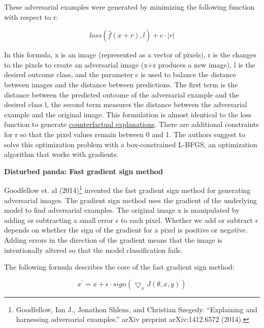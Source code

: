 \documentclass[12pt,]{krantz}
\begin{document}
These adversarial examples were generated by minimizing the following
function with respect to r:

\[loss(\hat{f}(x+r),l)+c\cdot|r|\]

In this formula, x is an image (represented as a vector of pixels), r is
the changes to the pixels to create an adversarial image (x+r produces a
new image), l is the desired outcome class, and the parameter c is used
to balance the distance between images and the distance between
predictions. The first term is the distance between the predicted
outcome of the adversarial example and the desired class l, the second
term measures the distance between the adversarial example and the
original image. This formulation is almost identical to the loss
function to generate \protect\hyperlink{counterfactual}{counterfactual
explanations}. There are additional constraints for r so that the pixel
values remain between 0 and 1. The authors suggest to solve this
optimization problem with a box-constrained L-BFGS, an optimization
algorithm that works with gradients.

\textbf{Disturbed panda: Fast gradient sign method}

Goodfellow et. al (2014)\footnote{Goodfellow, Ian J., Jonathon Shlens,
  and Christian Szegedy. ``Explaining and harnessing adversarial
  examples.'' arXiv preprint arXiv:1412.6572 (2014).} invented the fast
gradient sign method for generating adversarial images. The gradient
sign method uses the gradient of the underlying model to find
adversarial examples. The original image x is manipulated by adding or
subtracting a small error \(\epsilon\) to each pixel. Whether we add or
subtract \(\epsilon\) depends on whether the sign of the gradient for a
pixel is positive or negative. Adding errors in the direction of the
gradient means that the image is intentionally altered so that the model
classification fails.

The following formula describes the core of the fast gradient sign
method:

\[x^\prime=x+\epsilon\cdot{}sign(\bigtriangledown_x{}J(\theta,x,y))\]
\end{document}
